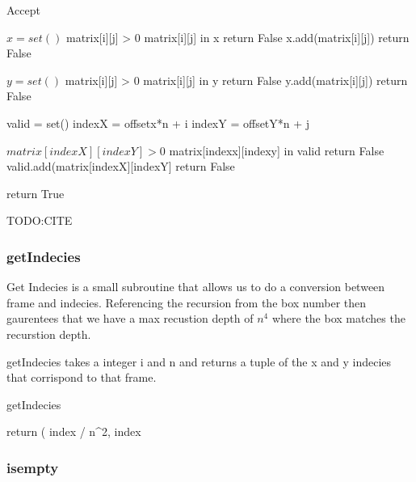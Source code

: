 \documentclass{sig-alternate}
\begin{document}
\begin{algorithm}
\caption{Accept}\label{accept}
\begin{algorithmic}[1]

\State $x = set()$
\If matrix[i][j] > 0
\If matrix[i][j] in x
\State return False
\EndIf
\State x.add(matrix[i][j])
\Else
\State return False
\EndIf
\EndFor

\State $y = set()$
\If matrix[i][j] > 0
\If matrix[i][j] in y
\State return False
\EndIf
\State y.add(matrix[i][j])
\Else
\State return False
\EndIf
\EndFor

\State valid = set()
    \State indexX = offsetx*n + i
    \State indexY = offsetY*n + j

    \If $matrix[indexX][indexY] > 0$
    \If matrix[indexx][indexy] in valid 
    \State return False
    \EndIf
    \State valid.add(matrix[indexX][indexY]
    \Else
    \State return False
    \EndIf
    
    \EndFor
    \EndFor
\EndFor
\EndFor
\State return True
\EndProcedure
\end{algorithmic}
\end{algorithm}
TODO:CITE

\subsubsection{getIndecies}
Get Indecies is a small subroutine that allows us to do a conversion between frame and indecies. Referencing the
recursion from the box number then gaurentees that we have a max recustion depth of $n^4$ where the box matches the recurstion depth. 

getIndecies takes a integer i and n and returns a tuple of the x and y indecies that corrispond to that frame.
\begin{algorithm}
\caption{getIndecies}\label{getIndecies}
\begin{algorithmic}[1]
\State return ( index / n^2, index %
\EndProcedure
\end{algorithmic}
\end{algorithm}


\subsubsection{isempty}
\end{document}
